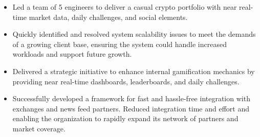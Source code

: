 \documentclass[a4paper,10pt]{article}
\begin{document}
    \begin{itemize}
        \item Led a team of 5 engineers to deliver a casual crypto portfolio with near real-time market data, daily challenges, and social elements.
        \item Quickly identified and resolved system scalability issues to meet the demands of a growing client base, ensuring the system could handle increased workloads and support future growth.
        \item Delivered a strategic initiative to enhance internal gamification mechanics by providing near real-time dashboards, leaderboards,
        and daily challenges.
        \item Successfully developed a framework for fast and hassle-free integration with exchanges and news feed partners.
        Reduced integration time and effort and enabling the organization to rapidly expand its network of partners and market coverage.
    \end{itemize}
\end{document}
